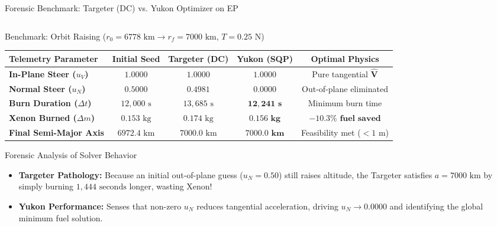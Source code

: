 \documentclass[aspectratio=169, 10pt]{beamer}
\begin{document}
\begin{frame}{Forensic Benchmark: Targeter (DC) vs. Yukon Optimizer on EP}
    \begin{columns}[T]
        \begin{column}{0.55\textwidth}
            \begin{block}{Benchmark: Orbit Raising ($r_0 = 6778\text{ km} \to r_f = 7000\text{ km}$, $T = 0.25\text{ N}$)}
                \centering
                \vspace{1pt}
                \fontsize{5.2pt}{6.3pt}\selectfont
                \setlength{\tabcolsep}{2.2pt}
                \renewcommand{\arraystretch}{1.2}
                \begin{tabular}{lcccc}
                    \toprule
                    \textbf{Telemetry Parameter} & \textbf{Initial Seed} & \textbf{Targeter (DC)} & \textbf{Yukon (SQP)} & \textbf{Optimal Physics} \\ \midrule
                    \textbf{In-Plane Steer ($u_V$)}  & $1.0000$ & $1.0000$ & $\mathbf{1.0000}$ & Pure tangential $\hat{\mathbf{V}}$ \\
                    \textbf{Normal Steer ($u_N$)}    & $0.5000$ & $0.4981$ & $\mathbf{0.0000}$ & Out-of-plane eliminated \\
                    \textbf{Burn Duration ($\Delta t$)} & $12{,}000\text{ s}$ & $13{,}685\text{ s}$ & $\mathbf{12{,}241\text{ s}}$ & Minimum burn time \\
                    \textbf{Xenon Burned ($\Delta m$)} & $0.153\text{ kg}$ & $0.174\text{ kg}$ & $\mathbf{0.156\text{ kg}}$ & $\mathbf{-10.3\%\text{ fuel saved}}$ \\
                    \textbf{Final Semi-Major Axis}   & $6972.4\text{ km}$ & $7000.0\text{ km}$ & $\mathbf{7000.0\text{ km}}$ & Feasibility met ($< 1\text{ m}$) \\
                    \bottomrule
                \end{tabular}
                \vspace{2pt}
            \end{block}
            \vspace{-0.15cm}
            \begin{alertblock}{Forensic Analysis of Solver Behavior}
                \scriptsize
                \begin{itemize}\setlength{\itemsep}{1pt}\setlength{\topsep}{0pt}
                    \item \textbf{Targeter Pathology:} Because an initial out-of-plane guess ($u_N = 0.50$) still raises altitude, the Targeter satisfies $a = 7000\text{ km}$ by simply burning $1{,}444\text{ seconds}$ longer, wasting Xenon!
                    \item \textbf{Yukon Performance:} Senses that non-zero $u_N$ reduces tangential acceleration, driving $u_N \to 0.0000$ and identifying the global minimum fuel solution.
                \end{itemize}
            \end{alertblock}
        \end{column}


\end{columns}
\end{frame}
\end{document}
